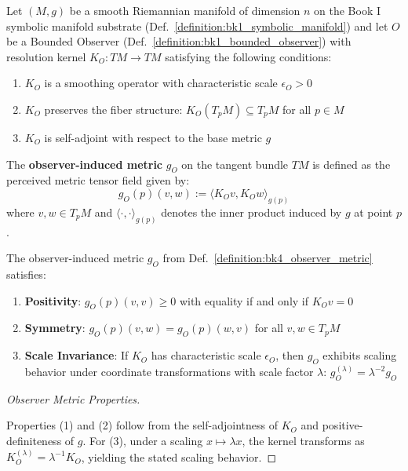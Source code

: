 \begin{definition}\label{definition:bk4_observer_metric}
Let $(M, g)$ be a smooth Riemannian manifold of dimension $n$ on the Book I symbolic manifold substrate (Def.~\ref{definition:bk1_symbolic_manifold}) and let $O$ be a Bounded Observer (Def.~\ref{definition:bk1_bounded_observer}) with resolution kernel $K_O: TM \to TM$ satisfying the following conditions:
\begin{enumerate}
    \item $K_O$ is a smoothing operator with characteristic scale $\epsilon_O > 0$
    \item $K_O$ preserves the fiber structure: $K_O(T_pM) \subseteq T_pM$ for all $p \in M$
    \item $K_O$ is self-adjoint with respect to the base metric $g$
\end{enumerate}
The \textbf{observer-induced metric} $g_O$ on the tangent bundle $TM$ is defined as the perceived metric tensor field given by:
\begin{equation}
    g_O(p)(v, w) := \langle K_O v, K_O w \rangle_{g(p)}
\end{equation}
where $v, w \in T_pM$ and $\langle \cdot, \cdot \rangle_{g(p)}$ denotes the inner product induced by $g$ at point $p$.
\end{definition}

\begin{lemma}\label{lemma:bk4_observer_metric_properties}
The observer-induced metric $g_O$ from Def.~\ref{definition:bk4_observer_metric} satisfies:
\begin{enumerate}
    \item \textbf{Positivity}: $g_O(p)(v,v) \geq 0$ with equality if and only if $K_O v = 0$
    \item \textbf{Symmetry}: $g_O(p)(v,w) = g_O(p)(w,v)$ for all $v,w \in T_pM$
    \item \textbf{Scale Invariance}: If $K_O$ has characteristic scale $\epsilon_O$, then $g_O$ exhibits scaling behavior under coordinate transformations with scale factor $\lambda$: $g_O^{(\lambda)} = \lambda^{-2} g_O$
\end{enumerate}
\end{lemma}

\begin{proof}[Observer Metric Properties]
\label{proof:bk4_observer_metric_properties}
\leavevmode

Properties (1) and (2) follow from the self-adjointness of $K_O$ and positive-definiteness of $g$.
For (3), under a scaling $x \mapsto \lambda x$, the kernel transforms as $K_O^{(\lambda)} = \lambda^{-1} K_O$, yielding the stated scaling behavior.
\end{proof}

